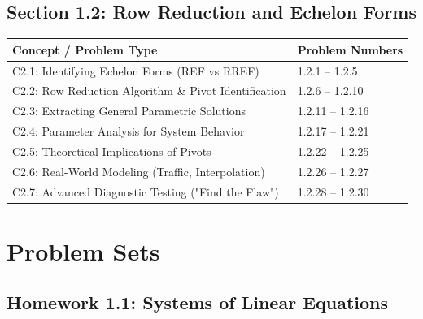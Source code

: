 \documentclass[11pt]{article}
\begin{document}
\subsection*{Section 1.2: Row Reduction and Echelon Forms}
\begin{table}[h]
\centering
\begin{tabular}{@{}ll@{}}
\toprule
\textbf{Concept / Problem Type} & \textbf{Problem Numbers} \\ \midrule
C2.1: Identifying Echelon Forms (REF vs RREF) & 1.2.1 -- 1.2.5 \\
C2.2: Row Reduction Algorithm \& Pivot Identification & 1.2.6 -- 1.2.10 \\
C2.3: Extracting General Parametric Solutions & 1.2.11 -- 1.2.16 \\
C2.4: Parameter Analysis for System Behavior & 1.2.17 -- 1.2.21 \\
C2.5: Theoretical Implications of Pivots & 1.2.22 -- 1.2.25 \\
C2.6: Real-World Modeling (Traffic, Interpolation) & 1.2.26 -- 1.2.27 \\
C2.7: Advanced Diagnostic Testing ("Find the Flaw") & 1.2.28 -- 1.2.30 \\ \bottomrule
\end{tabular}
\end{table}

\newpage

\section{Problem Sets}

\subsection{Homework 1.1: Systems of Linear Equations}
\end{document}
